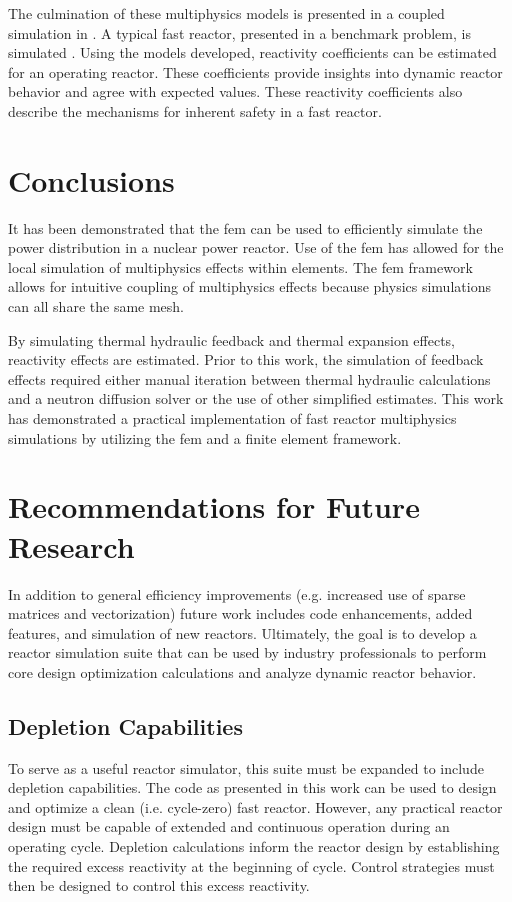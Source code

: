   The culmination of these multiphysics models is presented in a coupled
  simulation in . A typical fast reactor, presented in 
  a benchmark problem, is simulated \cite{abr}. Using the models developed, 
  reactivity coefficients can be estimated for an operating reactor. These 
  coefficients provide insights into dynamic reactor behavior and agree with 
  expected values. These reactivity coefficients also describe the mechanisms 
  for inherent safety in a fast reactor.

\section{Conclusions}
  
  It has been demonstrated that the \gls{fem} can be used to efficiently
  simulate the power distribution in a nuclear power reactor. Use of the
  \gls{fem} has allowed for the local simulation of multiphysics effects within
  elements.  The \gls{fem} framework allows for intuitive coupling of
  multiphysics effects because physics simulations can all share the same mesh.

  By simulating thermal hydraulic feedback and thermal expansion effects,
  reactivity effects are estimated. Prior to this work, the simulation of
  feedback effects required either manual iteration between thermal hydraulic
  calculations and a neutron diffusion solver or the use of other simplified
  estimates. This work has demonstrated a practical implementation of fast
  reactor multiphysics simulations by utilizing the \gls{fem} and a finite
  element framework.
  
\section{Recommendations for Future Research}

  In addition to general efficiency improvements (e.g. increased use of sparse
  matrices and vectorization) future work includes code enhancements, added 
  features, and simulation of new reactors. Ultimately, the goal is to develop a
  reactor simulation suite that can be used by industry professionals to perform 
  core design optimization calculations and analyze dynamic reactor behavior. 

  \subsection{Depletion Capabilities}
    To serve as a useful reactor simulator, this suite must be expanded to 
    include depletion capabilities. The code as presented in this work can be 
    used to design and optimize a clean (i.e. cycle-zero) fast reactor. However,
    any practical reactor design must be capable of extended and continuous 
    operation during an operating cycle. Depletion calculations inform the 
    reactor design by establishing the required excess reactivity at the 
    beginning of cycle. Control strategies must then be designed to control 
    this excess reactivity. 

